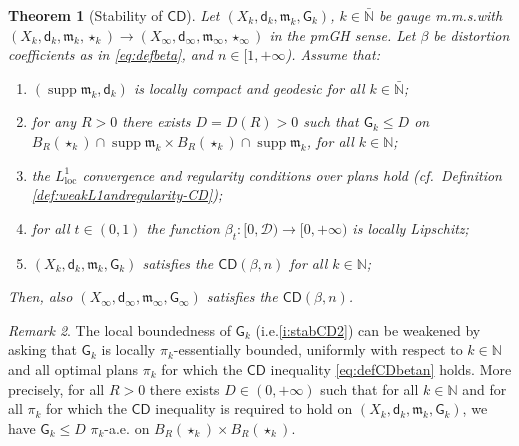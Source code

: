 \documentclass[11pt,a4paper]{article}
\theoremstyle{plain}
\newtheorem{theorem}{Theorem}[section]
\theoremstyle{definition}
\theoremstyle{remark}
\newtheorem{remark}[theorem]{Remark}
\numberwithin{equation}{section}
\newcommand{\N}{\mathbb{N}} %
\DeclareMathOperator{\supp}{\mathrm{supp}}
\newcommand{\CD}{\mathsf{CD}}
\newcommand{\cD}{\mathcal{D}}
\newcommand{\loc}{\mathrm{loc}}
\newcommand{\mm}{\mathfrak m}
\newcommand{\sfd}{\mathsf d}
\newcommand{\sfG}{\mathsf G}
\begin{document}
\begin{theorem}[Stability of $\CD$]\label{thm:stabCD}
Let $(X_k, \sfd_k, \mm_k,\sfG_k)$, $k\in \bar{\N}$ be gauge m.m.s.\@ with $(X_k, \sfd_k,\mm_k,\star_k) \to (X_\infty,\sfd_\infty,\mm_\infty,\star_\infty)$ in the pmGH sense. Let $\beta$ be distortion coefficients as in \eqref{eq:defbeta}, and $n\in [1,+\infty$). Assume that:
\begin{enumerate}[label = (\roman*)]
\item\label{i:stabCD1} $(\supp\mm_k, \sfd_k)$ is locally compact and geodesic for all $k\in\bar{\N}$;
\item\label{i:stabCD2}  for any $R>0$ there exists $D = D(R) >0$ such that $\sfG_k \leq D$ on $ B_R(\star_k)\cap \supp \mm_k\times B_R(\star_k)\cap \supp\mm_k$, for all $k\in \N$;
\item\label{i:stabCD3} the $L^1_{\loc}$ convergence and regularity conditions over plans hold (cf.\ Definition \ref{def:weakL1andregularity-CD});
\item\label{i:stabCD4} for all $t\in (0,1)$ the function $\beta_t: [0,\cD) \to [0,+\infty)$ is locally Lipschitz;
\item\label{i:stabCD5} $(X_k, \sfd_k,\mm_k,\sfG_k)$ satisfies the $\CD(\beta,n)$ for all $k\in \N$;
\end{enumerate}
Then, also $(X_\infty,\sfd_\infty,\mm_\infty,\sfG_\infty)$ satisfies the $\CD(\beta,n)$.
\end{theorem}
\begin{remark}
The local boundedness of $\sfG_k$ (i.e.\@ \ref{i:stabCD2})  can be weakened by asking that $\sfG_k$ is locally $\pi_k$-essentially bounded, uniformly with respect to $k\in \N$ and all optimal plans $\pi_k$ for which the $\CD$ inequality \eqref{eq:defCDbetan} holds. More precisely, for all $R>0$ there exists $D\in (0,+\infty)$ such that for all $k\in \N$ and for all $\pi_k$ for which the $\CD$ inequality is required to hold on $(X_k,\sfd_k,\mm_k,\sfG_k)$, we have $\sfG_k\leq D$ $\pi_k$-a.e. on $B_{R}(\star_k)\times B_R(\star_k)$.
\end{remark}
\end{document}
